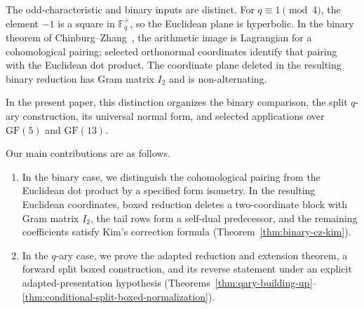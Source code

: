 \documentclass[12pt]{article}
\newcommand{\F}{\mathbb{F}}
\newcommand{\GF}[1]{\ensuremath{\mathrm{GF}(#1)}}
\begin{document}
The odd-characteristic and binary inputs are distinct. For
\(q\equiv1\pmod4\), the element \(-1\) is a square in \(\F_q^\times\), so
the Euclidean plane is hyperbolic. In the binary theorem of
Chinburg--Zhang~\cite{ChinburgZhang}, the arithmetic image is Lagrangian for
a cohomological pairing; selected orthonormal coordinates identify that
pairing with the Euclidean dot product. The coordinate plane deleted in the
resulting binary reduction has Gram matrix \(I_2\) and is non-alternating.

In the present paper, this distinction organizes the binary comparison, the
split \(q\)-ary construction, its universal normal form, and selected
applications over \(\GF{5}\) and \(\GF{13}\).

Our main contributions are as follows.
\begin{enumerate}[label=(\arabic*)]



\item In the binary case, we distinguish the cohomological pairing from the
Euclidean dot product by a specified form isometry. In the resulting
Euclidean coordinates, boxed reduction deletes a two-coordinate block with
Gram matrix \(I_2\), the tail rows form a self-dual predecessor, and the
remaining coefficients satisfy Kim's correction formula
(Theorem~\ref{thm:binary-cz-kim}).

\item In the \(q\)-ary case, we prove the adapted reduction and extension
theorem, a forward split boxed construction, and its reverse statement under
an explicit adapted-presentation hypothesis
(Theorems~\ref{thm:qary-building-up}--\ref{thm:conditional-split-boxed-normalization}).


\end{enumerate}
\end{document}
